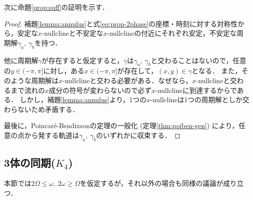\documentclass[../main]{subfiles}
\begin{document}
    次に命題\ref{prop:suff}の証明を示す．
    \begin{proof}
        補題\ref{lemma:annulus}と式\eqref{eq:prop-2phase}の座標・時刻に対する対称性から，安定な$x$-nullclineと不安定な$x$-nullclineの付近にそれぞれ安定，不安定な周期解$\gamma_a,\ \gamma_b$を持つ．

        他に周期解$\gamma$が存在すると仮定すると，$\gamma$は$\gamma_a,\ \gamma_b$と交わることはないので，任意の$y\in(-\pi,\pi]$に対し，ある$x\in(-\pi,\pi]$が存在して，$(x,y)\in\gamma$となる．
        また，そのような周期解は$x$-nullclineと交わる必要がある．なぜなら，$x$-nullclineと交わるまで流れの$x$成分の符号が変わらないので必ず$x$-nullclineに到達するからである．
        しかし，補題\ref{lemma:annulus}より，1つの$x$-nullclineは1つの周期解としか交わらないため矛盾する．

        最後に，Poincar\'{e}-Bendixsonの定理の一般化 (定理\ref{thm:poiben-gen}) により，任意の点から発する軌道は$\gamma_a,\ \gamma_b$のいずれかに収束する．
    \end{proof}

    \subsection{3体の同期($K_4$)}
    \label{sec:3body-k4}
    本節では$2\Omega\leq\omega,\ 2\omega\geq\Omega$を仮定するが，それ以外の場合も同様の議論が成り立つ．
\end{document}
